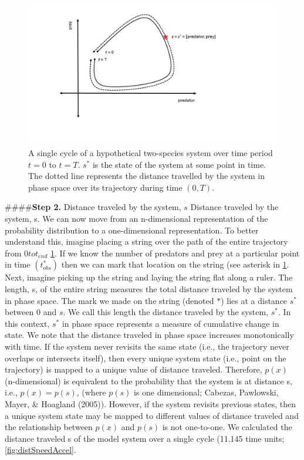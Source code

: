 \documentclass[12pt,twoside]{reedthesis}
\begin{document}
\begin{figure}

{\centering \includegraphics[width=1\linewidth]{./chapterFiles/fiGuide/figures/stringFig} 

}

\caption{A single cycle of a hypothetical two-species system over time period $t = 0$ to $t = T$. $s^*$ is the state of the system at some point in time. The dotted line represents the distance travelled by the system in phase space over its trajectory during time $(0, T)$.}\label{fig:stringFig}
\end{figure}
\#\#\#\#\textbf{Step 2.} Distance traveled by the system, \(s\)
Distance traveled by the system, s. We can now move from an n-dimensional representation of the probability distribution to a one-dimensional representation. To better understand this, imagine placing a string over the path of the entire trajectory from \(0 to t_{end}\) \ref{fig:stringFig}. If we know the number of predators and prey at a particular point in time \((t_{obs}^*)\) then we can mark that location on the string (see asterisk in \ref{fig:stringFig}. Next, imagine picking up the string and laying the string flat along a ruler. The length, s, of the entire string measures the total distance traveled by the system in phase space. The mark we made on the string (denoted \(*\)) lies at a distance \(s^*\) between 0 and \(s\). We call this length the distance traveled by the system, \(s^*\). In this context, \(s^*\) in phase space represents a measure of cumulative change in state. We note that the distance traveled in phase space increases monotonically with time. If the system never revisits the same state (i.e., the trajectory never overlaps or intersects itself), then every unique system state (i.e., point on the trajectory) is mapped to a unique value of distance traveled. Therefore, \(p(x)\) (n-dimensional) is equivalent to the probability that the system is at distance s, i.e., \(p(x)=p(s)\), (where \(p(s)\) is one dimensional; Cabezas, Pawlowski, Mayer, \& Hoagland (2005)). However, if the system revisits previous states, then a unique system state may be mapped to different values of distance traveled and the relationship between \(p(x)\) and \(p(s)\) is not one-to-one. We calculated the distance traveled s of the model system over a single cycle (11.145 time units; \ref{fig:distSpeedAccel}.
\end{document}
